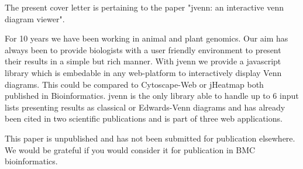 \documentclass[10pt,stdletter,dateno,sigleft]{newlfm} %
\begin{document}
\begin{newlfm}


The present cover letter is pertaining to the paper "jvenn: an interactive venn diagram viewer".

For 10 years we have been working in animal and plant genomics. Our aim has always been to provide biologists with a user friendly environment 
to present their results in a simple but rich manner. With jvenn we provide a javascript library which is embedable in any web-platform to 
interactively display Venn diagrams. This could be compared to Cytoscape-Web or jHeatmap both published in Bioinformatics. jvenn is the only 
library able to handle up to 6 input lists presenting results as classical or Edwards-Venn diagrams and has already been cited in two scientific 
publications and is part of three web applications. 

This paper is unpublished and has not been submitted for publication elsewhere.
We would be grateful if you would consider it for publication in BMC bioinformatics.


\end{newlfm}
\end{document}
